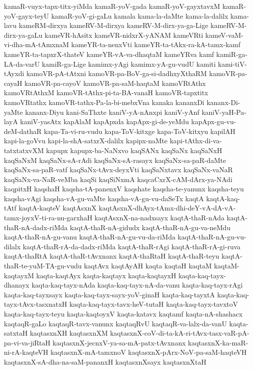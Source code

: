 {kamaR-vuyx-tapx-titx-yiMda
kamaR-yoV-gada
kamaR-yoV-gayxtavxM
kamaR-yoV-gayx-teyU
kamaR-yoV-gi-gaLu
kamala
kama-la-daMte
kama-la-dalilx
kama-lavu
kameRM-dirxya
kameRV-M-dirxya
kameRV-M-dirx-ya-ga-Lige
kameRV-M-dirx-ya-gaLu
kameVR-hAsitx
kameVR-nidxrX-yANAM
kameVRti
kameV-vaM-vi-dha-mA-tAmxnaM
kameYR-ta-nenxVti
kameYR-ta-tAkx-ra-kA-tamx-kamf
kameYR-ta-tapxrX-thateV
kameYR-vA-va-dhaqtaM
kameYRva
kamf
kamiR-ga-LA-da-varU
kamiR-ga-Lige
kamimx-yAgi
kamimx-yA-gu-vudU
kamiti
kami-tiV-tAyxdi
kamoVR-pA-tAtxni
kamoVR-pa-BoV-ga-si-dadhxyXthaRM
kamoVR-pa-cayaH
kamoVR-pa-cayoV
kamoVR-pa-saM-haqtaM
kamoVRtAthx
kamoVRtAthxM
kamoVR-tAthx-pi-ta-BA-vanaH
kamoVR-tapxtitx
kamoVRtathx
kamoVR-tathx-Pa-la-bi-mebxVna
kanaka
kananxDi
kananx-Di-yaMte
kananx-Diyu
kani-SaThxte
kaniV-yA-nAnxpi
kaniV-yAnf
kaniV-yaH-Pa-layA
kaniV-yasAtx
kapAlaM
kapApxda
kapApx-gi-de-yeMdu
kapApx-gu-vu-deM-dathaR
kapa-Ta-vi-ru-vudu
kapa-ToV-kitxge
kapa-ToV-kitxyu
kapilAH
kapi-la-goVvu
kapi-la-shA-satxrX-dalilx
kapipx-naMte
kapi-tAthx-di-va-tatxtatxvXM
kapupx
kapupx-ba-NaNxvo
kaqSANx
kaqSaNx
kaqSaNxH
kaqSaNxM
kaqSaNx-sA-rAdi
kaqSaNx-sA-rasayx
kaqSaNx-sa-paR-daMte
kaqSaNx-sa-paR-vatf
kaqSaNx-tAvx-deyxVti
kaqSaNxtavx
kaqSaNx-vaNaR
kaqSaNx-va-NaR-veMba
kaqSi
kaqSiNxmA
kaqcaCxrX-cAM-dArx-ya-NAdi
kaqpitxH
kaqshaH
kaqsha-tA-panenxV
kaqshate
kaqsha-te-yanunx
kaqsha-teyu
kaqsha-vAgi
kaqsha-vA-gu-vaMte
kaqsha-vA-gu-vu-daSeTx
kaqtA
kaqtA-kaq-tAtf
kaqtA-kaqteV
kaqtAsxnX
kaqtAsxnX-dhAyx-tAmx-dhi-deY-vA-dA-vA-tamx-joyxV-ti-ra-nu-garxhaH
kaqtAsxnX-na-nadxsayx
kaqtA-thaR-nAda
kaqtA-thaR-nA-dadx-riMda
kaqtA-thaR-nA-gidudx
kaqtA-thaR-nA-gu-va-neMdu
kaqtA-thaR-nA-gu-vanu
kaqtA-thaR-nA-gu-vu-da-riMda
kaqtA-thaR-nA-gu-vu-dilalx
kaqtA-thaR-rA-da-dadx-riMda
kaqtA-thaR-rAgi
kaqtA-thaR-rA-gi-ruva
kaqtA-thaRtA
kaqtA-thaR-tAvxnanx
kaqtA-thaRtaH
kaqtA-thaR-teyu
kaqtA-thaR-te-yuM-TA-gu-vudu
kaqtAvx
kaqtAyAH
kaqta
kaqtaH
kaqtaM
kaqtaM-kaqtayxM
kaqta-kaqtAyx
kaqta-kaqtayx
kaqta-kaqtayxH
kaqta-kaq-tayx-dhanayx
kaqta-kaq-tayx-nAda
kaqta-kaq-tayx-nA-da-vanu
kaqta-kaq-tayx-rAgi
kaqta-kaq-tayxsayx
kaqta-kaq-tayx-sayx-yoV-ginaH
kaqta-kaq-tayxtA
kaqta-kaq-tayx-tAvx-tasxnatxH
kaqta-kaq-tayx-tavx-heV-tutaH
kaqta-kaq-tayx-tavxtoV
kaqta-kaq-tayx-teyu
kaqta-kaqtoyxV
kaqta-katavx
kaqtamf
kaqta-nA-shashacx
kaqtaqR-gaLo
kaqtaqR-tavx-vanunx
kaqtaqRvU
kaqtaqR-va-lalx-da-vanU
kaqta-satxtaH
kaqtasxnXH
kaqtasxnXM
kaqtasxnX-coV-di-ta-kA-ri-tAvx-tasx-vaR-pA-pa-vi-va-jiRtaH
kaqtasxnX-jecnxV-ya-sa-mA-patx-tAvxnanx
kaqtasxnX-ka-maR-ni-rA-kaqteVH
kaqtasxnX-mA-tamxnoV
kaqtasxnX-pArx-NoV-pa-saM-haqteVH
kaqtasxnX-sA-dha-na-saM-pananxH
kaqtasxnXsayx
kaqtasxnXtaH
}
